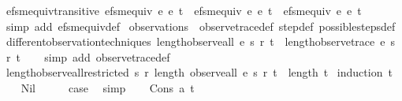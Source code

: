 \begin{isabellebody}
\endisatagproof
{\isafoldproof}%
%
\isadelimproof
\isanewline
%
\endisadelimproof
\isanewline
{}\isamarkupfalse%
\ efsm{\isacharunderscore}equiv{\isacharunderscore}transitive{\isacharcolon}\ {\isachardoublequoteopen}efsm{\isacharunderscore}equiv\ e{}\ e{}\ t\ {\isasymand}\ efsm{\isacharunderscore}equiv\ e{}\ e{}\ t\ {\isasymlongrightarrow}\ efsm{\isacharunderscore}equiv\ e{}\ e{}\ t{\isachardoublequoteclose}\isanewline
%
\isadelimproof
\ \ %
\endisadelimproof
%
\isatagproof
{}\isamarkupfalse%
\ {\isacharparenleft}simp\ add{\isacharcolon}\ efsm{\isacharunderscore}equiv{\isacharunderscore}def{\isacharparenright}%
\endisatagproof
{\isafoldproof}%
%
\isadelimproof
\isanewline
%
\endisadelimproof
\isanewline
{}\isamarkupfalse%
\ observations\ {\isacharequal}\ observe{\isacharunderscore}trace{\isacharunderscore}def\ step{\isacharunderscore}def\ possible{\isacharunderscore}steps{\isacharunderscore}def\isanewline
\isanewline
{}\isamarkupfalse%
\ different{\isacharunderscore}observation{\isacharunderscore}techniques{\isacharcolon}\ {\isachardoublequoteopen}length{\isacharparenleft}observe{\isacharunderscore}all\ e\ s\ r\ t{\isacharparenright}\ {\isacharequal}\ length{\isacharparenleft}observe{\isacharunderscore}trace\ e\ s\ r\ t{\isacharparenright}{\isachardoublequoteclose}\isanewline
%
\isadelimproof
\ \ %
\endisadelimproof
%
\isatagproof
{}\isamarkupfalse%
\ {\isacharparenleft}simp\ add{\isacharcolon}\ observe{\isacharunderscore}trace{\isacharunderscore}def{\isacharparenright}%
\endisatagproof
{\isafoldproof}%
%
\isadelimproof
\isanewline
%
\endisadelimproof
\isanewline
{}\isamarkupfalse%
\ length{\isacharunderscore}observe{\isacharunderscore}all{\isacharunderscore}restricted{\isacharcolon}\ {\isachardoublequoteopen}{\isasymAnd}s\ r{\isachardot}\ length\ {\isacharparenleft}observe{\isacharunderscore}all\ e\ s\ r\ t{\isacharparenright}\ {\isasymle}\ length\ t{\isachardoublequoteclose}\isanewline
%
\isadelimproof
%
\endisadelimproof
%
\isatagproof
{}\isamarkupfalse%
\ {\isacharparenleft}induction\ t{\isacharparenright}\isanewline
\ \ \isamarkupfalse%
\ Nil\isanewline
\ \ \isamarkupfalse%
\ \isamarkupfalse%
\ {\isacharquery}case\ \isamarkupfalse%
\ simp\isanewline
{}\isamarkupfalse%
\isanewline
\ \ \isamarkupfalse%
\ {\isacharparenleft}Cons\ a\ t{\isacharparenright}\isanewline
\ \ \isamarkupfalse%

\end{isabellebody}
